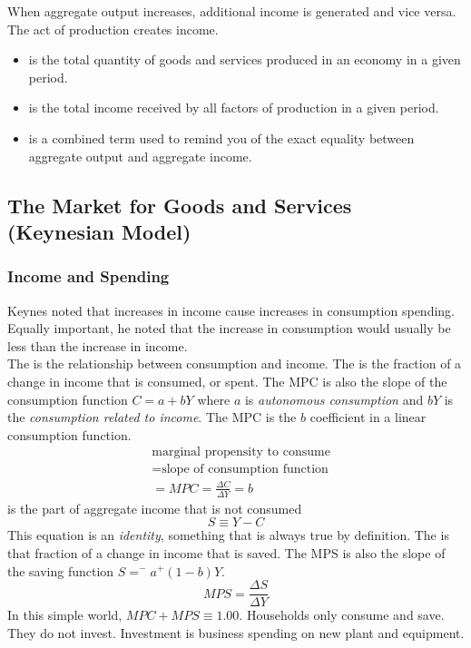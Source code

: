 \documentclass{article}
\begin{document}
When aggregate output increases, additional income is generated and vice versa. The act of production creates income. 
\begin{itemize}
  \item {} is the total quantity of goods and services produced in an economy in a given period. 
  \item {} is the total income received by all factors of production in a given period. 
  \item {} is a combined term used to remind you of the exact equality between aggregate output and aggregate income. 
\end{itemize} 

\subsection{The Market for Goods and Services (Keynesian Model)}

\subsubsection{Income and Spending}

Keynes noted that increases in income cause increases in consumption spending. Equally important, he noted that the increase in consumption would usually be less than the increase in income. \\ 

The  is the relationship between consumption and income. The  is the fraction of a change in income that is consumed, or spent. The MPC is also the slope of the consumption function $C = a+bY$ where $a$ is \emph{autonomous consumption} and $bY$ is the \emph{consumption related to income}. The MPC is the $b$ coefficient in a linear consumption function. 
\begin{align*}
  &\textrm{marginal propensity to consume} \\ 
  &= \textrm{slope of consumption function} \\ 
  &=MPC = \frac{\Delta C}{\Delta Y} = b
\end{align*}
 is the part of aggregate income that is not consumed 
$$S \equiv Y-C$$ 
This equation is an \emph{identity}, something that is always true by definition. The  is that fraction of a change in income that is saved. The MPS is also the slope of the saving function $S= ^{-}a^{+}(1-b)Y$.
$$MPS = \frac{\Delta S}{\Delta Y}$$
In this simple world, $MPC + MPS \equiv 1.00$. Households only consume and save. They do not invest. Investment is business spending on new plant and equipment.
\end{document}
